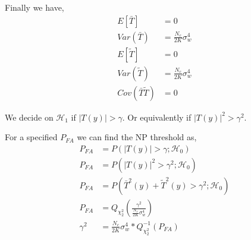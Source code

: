 \documentclass[a4 paper]{article}
\begin{document}
Finally we have,
\begin{align*}
	E[\bar{T}] &= 0 \\
	Var(\bar{T}) &= \frac{N_{c}}{2K} \sigma_{w}^{4}		\\
	E[\tilde{T}] &= 0 	\\
	Var(\tilde{T}) &= \frac{N_{c}}{2K} \sigma_{w}^{4}		\\
	Cov(\bar{T}\tilde{T}) &= 0
\end{align*}


\newpage
{}
We decide on $\mathcal{H}_{1}$ if $\lvert T(y) \rvert > \gamma$. Or equivalently if $\lvert T(y) \rvert^{2} > \gamma^{2}$.


For a specified $P_{FA}$ we can find the NP threshold as,
\begin{align*}
	P_{FA} &= P(\lvert T(y) \rvert > \gamma; \mathcal{H}_{0})	\\
	P_{FA} &= P(\lvert T(y) \rvert^{2} > \gamma^{2}; \mathcal{H}_{0})	\\
	P_{FA} &= P(\bar{T}^{2}(y) + \tilde{T}^{2}(y) > \gamma^{2}; \mathcal{H}_{0})	\\		
	P_{FA} &= Q_{\chi_{2}^{2}} \left( \frac{\gamma^{2}}{\frac{N_{c}}{2K}\sigma_{w}^{4}}  \right)	\\
	\gamma^{2} &= \frac{N_{c}}{2K}\sigma_{w}^{4} * Q_{\chi_{2}^{2}}^{-1} (P_{FA})
\end{align*}
\end{document}
